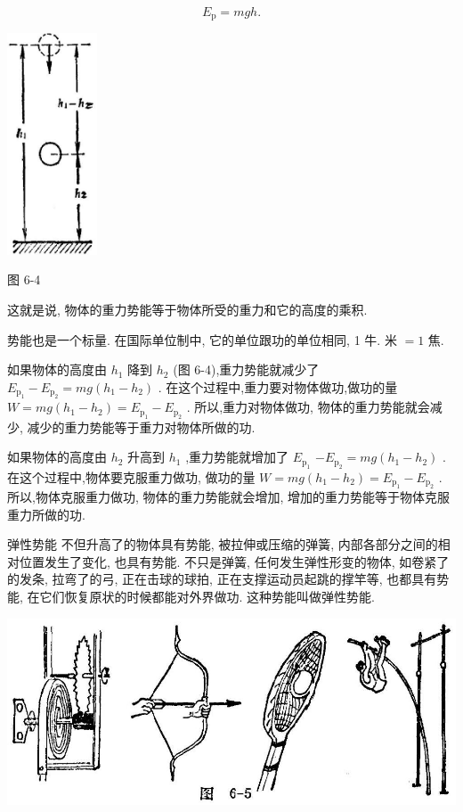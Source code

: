 \documentclass[10pt]{article}
\begin{document}
\[
{E}_{\mathrm{p}} = {mgh}\text{.}
\]

\begin{center}
\includegraphics[max width=0.2\textwidth]{images/01912d55-147c-70aa-b0e0-1782a122f948_178_729586.jpg}
\end{center}

图 6-4

这就是说, 物体的重力势能等于物体所受的重力和它的高度的乘积.

势能也是一个标量. 在国际单位制中, 它的单位跟功的单位相同, 1 牛. 米 \(= 1\) 焦.

如果物体的高度由 \({h}_{1}\) 降到 \({h}_{2}\) (图 6-4),重力势能就减少了 \({E}_{{\mathrm{p}}_{1}} - {E}_{{\mathrm{p}}_{2}} = {mg}\left( {{h}_{1} - {h}_{2}}\right)\) . 在这个过程中,重力要对物体做功,做功的量 \(W = {mg}\left( {{h}_{1} - {h}_{2}}\right) = {E}_{{\mathrm{p}}_{1}} - {E}_{{\mathrm{p}}_{2}}\) . 所以,重力对物体做功, 物体的重力势能就会减少, 减少的重力势能等于重力对物体所做的功.

如果物体的高度由 \({h}_{2}\) 升高到 \({h}_{1}\) ,重力势能就增加了 \({E}_{{\mathrm{p}}_{1}}\) \(- {E}_{{\mathrm{p}}_{2}} = {mg}\left( {{h}_{1} - {h}_{2}}\right)\) . 在这个过程中,物体要克服重力做功, 做功的量 \(W = {mg}\left( {{h}_{1} - {h}_{2}}\right) = {E}_{{\mathrm{p}}_{1}} - {E}_{{\mathrm{p}}_{2}}\) . 所以,物体克服重力做功, 物体的重力势能就会增加, 增加的重力势能等于物体克服重力所做的功.

弹性势能 不但升高了的物体具有势能, 被拉伸或压缩的弹簧, 内部各部分之间的相对位置发生了变化, 也具有势能. 不只是弹簧, 任何发生弹性形变的物体, 如卷紧了的发条, 拉弯了的弓, 正在击球的球拍, 正在支撑运动员起跳的撑竿等, 也都具有势能, 在它们恢复原状的时候都能对外界做功. 这种势能叫做弹性势能.

\begin{center}
\includegraphics[max width=1.0\textwidth]{images/01912d55-147c-70aa-b0e0-1782a122f948_179_626130.jpg}
\end{center}
\end{document}
